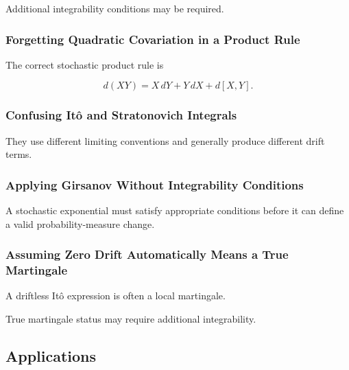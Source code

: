 Additional integrability conditions may be required.

\subsubsection{Forgetting Quadratic Covariation in a Product Rule}

The correct stochastic product rule is

\[
d(XY)
=
X\,dY
+
Y\,dX
+
d[X,Y].
\]

\subsubsection{Confusing It\^o and Stratonovich Integrals}

They use different limiting conventions and generally produce different
drift terms.

\subsubsection{Applying Girsanov Without Integrability Conditions}

A stochastic exponential must satisfy appropriate conditions before it
can define a valid probability-measure change.

\subsubsection{Assuming Zero Drift Automatically Means a True Martingale}

A driftless It\^o expression is often a local martingale.

True martingale status may require additional integrability.

\subsection{Applications}
\label{subsec:stochastic-calculus-applications}

